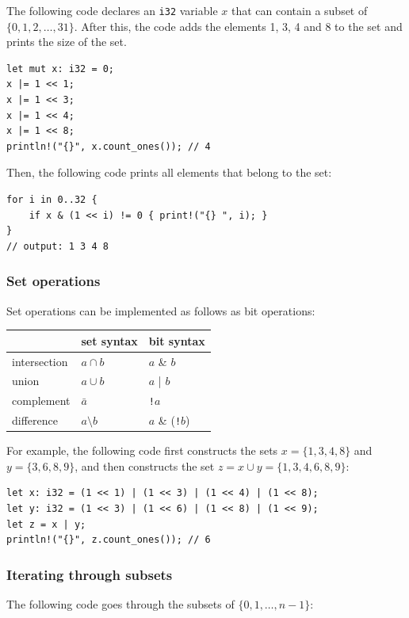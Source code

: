 The following code declares an \texttt{i32}
variable $x$ that can contain
a subset of $\{0,1,2,\ldots,31\}$.
After this, the code adds the elements 1, 3, 4 and 8
to the set and prints the size of the set.
\begin{lstlisting}
let mut x: i32 = 0;
x |= 1 << 1;
x |= 1 << 3;
x |= 1 << 4;
x |= 1 << 8;
println!("{}", x.count_ones()); // 4
\end{lstlisting}
Then, the following code prints all
elements that belong to the set:
\begin{lstlisting}
for i in 0..32 {
    if x & (1 << i) != 0 { print!("{} ", i); }
}
// output: 1 3 4 8
\end{lstlisting}

\subsubsection{Set operations}

Set operations can be implemented as follows as bit operations:

\begin{center}
\begin{tabular}{lll}
& set syntax & bit syntax \\
\hline
intersection & $a \cap b$ & $a$ \& $b$ \\
union & $a \cup b$ & $a$ | $b$ \\
complement & $\bar a$ & \texttt{!}$a$ \\
difference & $a \setminus b$ & $a$ \& (\texttt{!}$b$) \\
\end{tabular}
\end{center}

For example, the following code first constructs
the sets $x=\{1,3,4,8\}$ and $y=\{3,6,8,9\}$,
and then constructs the set $z = x \cup y = \{1,3,4,6,8,9\}$:

\begin{lstlisting}
let x: i32 = (1 << 1) | (1 << 3) | (1 << 4) | (1 << 8);
let y: i32 = (1 << 3) | (1 << 6) | (1 << 8) | (1 << 9);
let z = x | y;
println!("{}", z.count_ones()); // 6
\end{lstlisting}

\subsubsection{Iterating through subsets}

The following code goes through
the subsets of $\{0,1,\ldots,n-1\}$:

